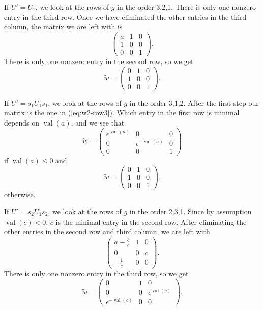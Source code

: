 \documentclass{amsart}
\theoremstyle{definition}
\def\e{\epsilon}
\def\w{\widetilde{w}}
\def\val{\mathop{\mathrm{val}}}
\begin{document}
  If $U' = U_1$, we look at the rows of $g$ in the order 3,2,1.  There is only
  one nonzero entry in the third row.  Once we have eliminated the other
  entries in the third column, the matrix we are left with is
  \begin{equation}\label{eq:w2-row3}
    \begin{pmatrix}
      a & 1 & 0 \\
      1 & 0 & 0 \\
      0 & 0 & 1
    \end{pmatrix}.
  \end{equation}
  There is only one nonzero entry in the second row, so we get 
  \begin{equation*}
    \w = \begin{pmatrix}
      0 & 1 & 0 \\
      1 & 0 & 0 \\
      0 & 0 & 1
    \end{pmatrix}.
  \end{equation*}

  If $U' = s_1 U_1 s_1$, we look at the rows of $g$ in the order 3,1,2.  After
  the first step our matrix is the one in (\ref{eq:w2-row3}).  Which entry in
  the first row is minimal depends on $\val(a)$, and we see that
  \begin{equation*}
    \w = \begin{pmatrix}
      \e^{\val(a)} & 0 & 0 \\
      0 & \e^{-\val(a)} & 0 \\
      0 & 0 & 1
    \end{pmatrix}
  \end{equation*}
  if $\val(a) \le 0$ and 
  \begin{equation*}\w = \begin{pmatrix}
      0 & 1 & 0 \\
      1 & 0 & 0 \\
      0 & 0 & 1
    \end{pmatrix}.
  \end{equation*}
  otherwise.

  If $U' = s_2 U_1 s_2$, we look at the rows of $g$ in the order 2,3,1.  Since
  by assumption $\val(c) < 0$, $c$ is the minimal entry in the second row.
  After eliminating the other entries in the second row and third column, we
  are left with
  \begin{equation}\label{eq:w2-row2}
    \begin{pmatrix}
      a-\frac{b}{c} & 1 & 0 \\
      0  & 0 & c \\
      -\frac{1}{c} & 0 & 0
    \end{pmatrix}.
  \end{equation}
  There is only one nonzero entry in the third row, so we get
  \begin{equation*}
    \w = \begin{pmatrix}
      0 & 1 & 0 \\
      0 & 0 & \e^{\val(c)} \\
      \e^{-\val(c)} & 0 & 0
    \end{pmatrix}.
  \end{equation*}
\end{document}

